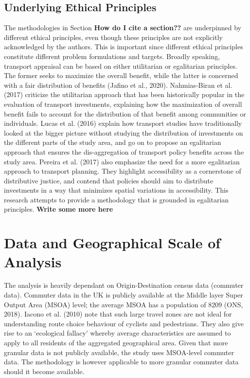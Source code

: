 \documentclass[]{elsarticle} %
\begin{document}
\hypertarget{underlying-ethical-principles}{%
\subsection{Underlying Ethical
Principles}\label{underlying-ethical-principles}}

The methodologies in Section \textbf{How do I cite a section??} are
underpinned by different ethical principles, even though these
principles are not explicitly acknowledged by the authors. This is
important since different ethical principles constitute different
problem formulations and targets. Broadly speaking, transport appraisal
can be based on either utilitarian or egalitarian principles. The former
seeks to maximize the overall benefit, while the latter is concerned
with a fair distribution of benefits (Jafino et al., 2020).
Nahmias-Biran et al. (2017) criticize the utilitarian approach that has
been historically popular in the evaluation of transport investments,
explaining how the maximization of overall benefit fails to account for
the distribution of that benefit among communities or individuals. Lucas
et al. (2016) explain how transport studies have traditionally looked at
the bigger picture without studying the distribution of investments on
the different parts of the study area, and go on to propose an
egalitarian approach that ensures the dis-aggregation of transport
policy benefits across the study area. Pereira et al. (2017) also
emphasize the need for a more egalitarian approach to transport
planning. They highlight accessibility as a cornerstone of distributive
justice, and contend that policies should aim to distribute investments
in a way that minimizes spatial variations in accessibility. This
research attempts to provide a methodology that is grounded in
egalitarian principles. \textbf{Write some more here}

\hypertarget{data-and-geographical-scale-of-analysis}{%
\section{Data and Geographical Scale of
Analysis}\label{data-and-geographical-scale-of-analysis}}

The analysis is heavily dependant on Origin-Destination census data
(commuter data). Commuter data in the UK is publicly available at the
Middle layer Super Output Area (MSOA) level; the average MSOA has a
population of 8209 (ONS, 2018). Iacono et al. (2010) note that such
large travel zones are not ideal for understanding route choice
behaviour of cyclists and pedestrians. They also give rise to an
`ecological fallacy' whereby average characteristics are assumed to
apply to all residents of the aggregated geographical area. Given that
more granular data is not publicly available, the study uses MSOA-level
commuter data. The methodology is however applicable to more granular
commuter data should it become available.
\end{document}
